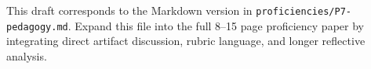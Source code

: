 \documentclass[12pt]{article}
\begin{document}
\begin{titlepage}\begin{center}\vspace*{0.2\textheight}{\Large\bfseries Proficiency 7: Pedagogy\par}\vspace{2em}{\PortfolioAuthor\par}{\PortfolioAffiliation\par}{\PortfolioProgram\par}\vspace{2em}{\PortfolioDate\par}\end{center}\end{titlepage}
This draft corresponds to the Markdown version in \texttt{proficiencies/P7-pedagogy.md}. Expand this file into the full 8--15 page proficiency paper by integrating direct artifact discussion, rubric language, and longer reflective analysis.
\end{document}
